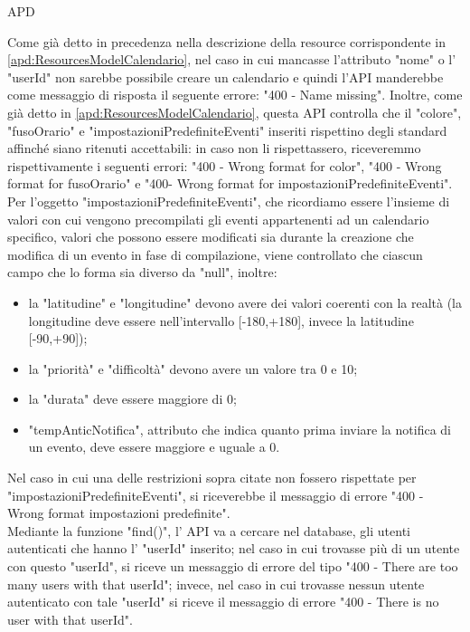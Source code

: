 \begin{listaPersonale} {APD}
\begin{listaPersonale2}[APD]{}
                Come già detto in precedenza nella descrizione della resource corrispondente in \ref{apd:ResourcesModelCalendario}, nel caso in cui mancasse l'attributo "nome" o l' "userId" non sarebbe possibile creare un calendario e quindi l'API manderebbe come messaggio di risposta il seguente errore: "400 - Name missing". Inoltre, come già detto in \ref{apd:ResourcesModelCalendario}, questa API controlla che il "colore", "fusoOrario" e "impostazioniPredefiniteEventi" inseriti rispettino degli standard affinché siano ritenuti accettabili: in caso non li rispettassero, riceveremmo rispettivamente i seguenti errori: "400 - Wrong format for color", "400 - Wrong format for fusoOrario" e "400- Wrong format for impostazioniPredefiniteEventi". Per l'oggetto "impostazioniPredefiniteEventi", che ricordiamo essere l'insieme di valori con cui vengono precompilati gli eventi appartenenti ad un calendario specifico, valori che possono essere modificati sia durante la creazione che modifica di un evento in fase di compilazione, viene controllato che ciascun campo che lo forma sia diverso da "null", inoltre:
                \begin{itemize}
                    \item la "latitudine" e "longitudine" devono avere dei valori coerenti con la realtà (la longitudine deve essere nell'intervallo [-180,+180], invece la latitudine [-90,+90]);
                    \item la "priorità" e "difficoltà" devono avere un valore tra 0 e 10;
                    \item la "durata" deve essere maggiore di 0;
                    \item "tempAnticNotifica", attributo che indica quanto prima inviare la notifica di un evento, deve essere maggiore e uguale a 0.
                \end{itemize}
                Nel caso in cui una delle restrizioni sopra citate non fossero rispettate per "impostazioniPredefiniteEventi", si riceverebbe il messaggio di errore "400 - Wrong format impostazioni predefinite". \\
                Mediante la funzione "find()", l' API va a cercare nel database, gli utenti autenticati che hanno l' "userId" inserito; nel caso in cui trovasse più di un utente con questo "userId", si riceve un messaggio di errore del tipo "400 - There are too many users with that userId"; invece, nel caso in cui trovasse nessun utente autenticato con tale "userId" si riceve il messaggio di errore "400 - There is no user with that userId". \\

\end{listaPersonale2}
\end{listaPersonale}
